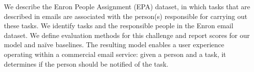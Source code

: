 We describe the Enron People Assignment (EPA) dataset, in which tasks that are described in emails are associated with the person(s) responsible for carrying out these tasks. We identify tasks and the responsible people in the Enron email dataset. We define evaluation methods for this challenge and report scores for our model and naïve baselines. The resulting model enables a user experience operating within a commercial email service: given a person and a task, it determines if the person should be notified of the task.
